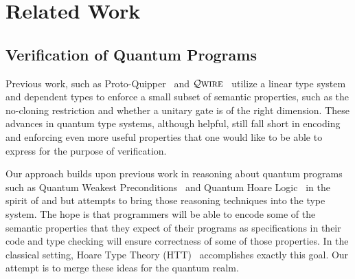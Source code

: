 \documentclass[acmsmall,nonacm,timestamp,review=false,anonymous=false]{acmart}
\newcommand{\qwire}{\ensuremath{\mathcal{Q}\textsc{wire}}\xspace}
\begin{document}



\section{Related Work}
\label{sec:related}


\subsection{Verification of Quantum Programs}
Previous work, such as Proto-Quipper~\cite{ross_algebraic_2015,rios_categorical_2017} and \qwire~\cite{paykin_qwire:_2017,rand_qwire_2017,rand_formally_2018} utilize a linear type system and dependent types to enforce a small subset of semantic properties, such as the no-cloning restriction and whether a unitary gate is of the right dimension. These advances in quantum type systems, although helpful, still fall short in encoding and enforcing even more useful properties that one would like to be able to express for the purpose of verification.

Our approach builds upon previous work in reasoning about quantum programs such as Quantum Weakest Preconditions~\cite{dhondt_quantum_2006} and Quantum Hoare Logic~\cite{ying_floydhoare_2012} in the spirit of \citet{hoare_axiomatic_1969} and \citet{dijkstra_discipline_1976} but attempts to bring those reasoning techniques into the type system. The hope is that programmers will be able to encode some of the semantic properties that they expect of their programs as specifications in their code and type checking will ensure correctness of some of those properties. In the classical setting, Hoare Type Theory (HTT)~\cite{nanevski_hoare_2008} accomplishes exactly this goal. Our attempt is to merge these ideas for the quantum realm.
\end{document}
